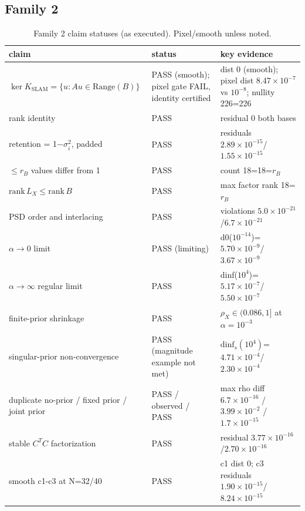 \documentclass[12pt]{article}
\begin{document}
\subsection{Family 2}
\begin{table}[ht]
\centering
\small
\caption{Family 2 claim statuses (as executed). Pixel/smooth unless noted.}
\label{app:tab:f2}
\begin{tabular}{p{} p{} p{}}
\toprule
claim & status & key evidence \\
\midrule
$\ker K_{\mathrm{SLAM}}=\{u: Au\in\mathrm{Range}(B)\}$ &
PASS (smooth); pixel gate FAIL, identity certified &
dist 0 (smooth); pixel dist $8.47\times10^{-7}$ vs $10^{-8}$; nullity 226=226 \\
rank identity & PASS & residual 0 both bases \\
retention = 1$-\sigma_i^2$, padded & PASS &
residuals $2.89\times10^{-15}$/$1.55\times10^{-15}$ \\
$\le r_B$ values differ from 1 & PASS & count 18=18=$r_B$ \\
$\mathrm{rank}\,L_X\le\mathrm{rank}\,B$ & PASS & max factor rank 18=$r_B$ \\
PSD order and interlacing & PASS &
violations $5.0\times10^{-21}$/$6.7\times10^{-21}$ \\
$\alpha\to0$ limit & PASS (limiting) &
d0($10^{-14}$)=$5.70\times10^{-9}$/$3.67\times10^{-9}$ \\
$\alpha\to\infty$ regular limit & PASS &
dinf($10^4$)=$5.17\times10^{-7}$/$5.50\times10^{-7}$ \\
finite-prior shrinkage & PASS &
$\rho_X\in(0.086,1]$ at $\alpha=10^{-3}$ \\
singular-prior non-convergence & PASS (magnitude example not met) &
$\mathrm{dinf}_s(10^4)$=$4.71\times10^{-4}$/$2.30\times10^{-4}$ \\
duplicate no-prior / fixed prior / joint prior &
PASS / observed / PASS &
max rho diff $6.7\times10^{-16}$ / $3.99\times10^{-2}$ / $1.7\times10^{-15}$ \\
stable $C^TC$ factorization & PASS &
residual $3.77\times10^{-16}$/$2.70\times10^{-16}$ \\
smooth c1-c3 at N=32/40 & PASS &
c1 dist 0; c3 residuals $1.90\times10^{-15}$/$8.24\times10^{-15}$ \\
\bottomrule
\end{tabular}
\end{table}
\end{document}
